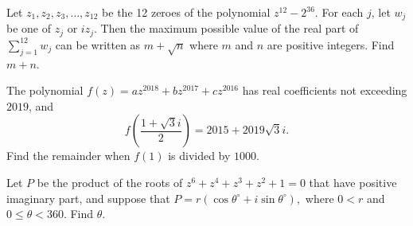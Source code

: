\begin{question}[name={2011 AIME II \#8}]
    Let $z_1,z_2,z_3,\dots,z_{12}$ be the 12 zeroes of the polynomial $z^{12}-2^{36}$. For each $j$, let $w_j$ be one of $z_j$ or $i z_j$. Then the maximum possible value of the real part of $\displaystyle\sum_{j=1}^{12} w_j$ can be written as $m+\sqrt{n}$ where $m$ and $n$ are positive integers. Find $m+n$.
\end{question}


\begin{question}[name={2019 AIME II \#8}]
    The polynomial $f(z)=az^{2018}+bz^{2017}+cz^{2016}$ has real coefficients not exceeding $2019$, and 
    \[f\left(\dfrac{1+\sqrt{3}i}{2}\right)=2015+2019\sqrt{3}i.\] Find the remainder when $f(1)$ is divided by $1000$.
\end{question}


\begin{question}[name={1996 AIME \#11}]
    Let $P$ be the product of the roots of $z^6+z^4+z^3+z^2+1=0$ that have positive imaginary part, and suppose that $P=r(\cos \theta^\circ+i\sin \theta^\circ),$ where $0<r$ and $0\le \theta <360.$ Find $\theta.$
\end{question}

